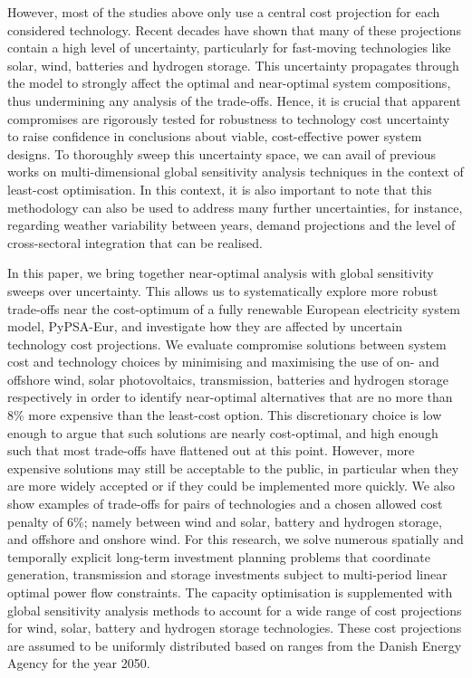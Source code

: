 However, most of the studies above only use a central cost projection for each
considered technology. Recent decades have shown that many of these projections
contain a high level of uncertainty, particularly for fast-moving technologies
like solar, wind, batteries and hydrogen storage.
\cite{ludererImpactDeclining2021,victoriaSolarPhotovoltaics2021,jaxa-rozenSourcesUncertainty2021}
This uncertainty propagates through the model to strongly affect the optimal and
near-optimal system compositions, thus undermining any analysis of the
trade-offs. Hence, it is crucial that apparent compromises are rigorously tested
for robustness to technology cost uncertainty to raise confidence in conclusions
about viable, cost-effective power system designs. To thoroughly sweep this
uncertainty space, we can avail of previous works on multi-dimensional global
sensitivity analysis techniques in the context of least-cost
optimisation.\cite{trondle_trade-offs_2020, mavromatidis_uncertainty_2018,
pizarro-alonso_uncertainties_2019, fais_impact_2016, usher_value_2015} In this
context, it is also important to note that this methodology can also be used to
address many further uncertainties, for instance, regarding weather variability
between years, demand projections and the level of cross-sectoral integration
that can be realised.


In this paper, we bring together near-optimal analysis with global sensitivity
sweeps over uncertainty. This allows us to systematically explore more robust
trade-offs near the cost-optimum of a fully renewable European electricity
system model, PyPSA-Eur,\cite{pypsaeur} and investigate how they are affected by
uncertain technology cost projections. We evaluate compromise solutions between
system cost and technology choices by minimising and maximising the use of on-
and offshore wind, solar photovoltaics, transmission, batteries and hydrogen
storage respectively in order to identify near-optimal alternatives that are no
more than 8\% more expensive than the least-cost option. This discretionary
choice is low enough to argue that such solutions are nearly cost-optimal, and
high enough such that most trade-offs have flattened out at this point. However,
more expensive solutions may still be acceptable to the public, in particular
when they are more widely accepted or if they could be implemented more quickly.
We also show examples of trade-offs for pairs of technologies and a chosen allowed
cost penalty of 6\%; namely between wind and solar, battery and hydrogen
storage, and offshore and onshore wind. For this research, we solve numerous
spatially and temporally explicit long-term investment planning problems that
coordinate generation, transmission and storage investments subject to
multi-period linear optimal power flow constraints. The capacity optimisation is
supplemented with global sensitivity analysis methods to account for a wide
range of cost projections for wind, solar, battery and hydrogen storage
technologies. These cost projections are assumed to be uniformly distributed
based on ranges from the Danish Energy Agency for the year 2050.\cite{DEA}

